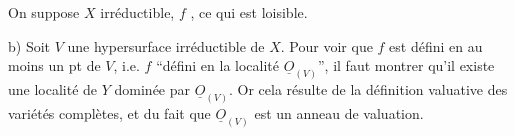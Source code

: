 
On suppose $X$ irréductible, $f$ , ce qui est loisible.

b) Soit $V$ une hypersurface irréductible de $X$. Pour voir que $f$ est défini en au moins un pt de $V$,  i.e. $f$ ``défini en la localité $\underline O_{(V)}$'', il faut montrer qu'il existe une localité de $Y$ dominée par $\underline O_{(V)}$. Or cela résulte de la définition valuative des variétés complètes, et du fait que $\underline O_{(V)}$ est un anneau de valuation.


